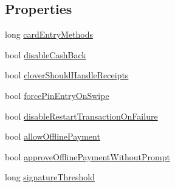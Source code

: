 \subsection*{Properties}
\begin{DoxyCompactItemize}
\item 
long \hyperlink{classcom_1_1clover_1_1sdk_1_1v3_1_1payments_1_1_transaction_settings_ad1e0b5409238f8adcd7cecd1c8d340bd}{card\+Entry\+Methods}
\item 
bool \hyperlink{classcom_1_1clover_1_1sdk_1_1v3_1_1payments_1_1_transaction_settings_a3509280eeb0afca8fe16f6912a5dcb61}{disable\+Cash\+Back}
\item 
bool \hyperlink{classcom_1_1clover_1_1sdk_1_1v3_1_1payments_1_1_transaction_settings_a0af7a01b27e4e6de4e963e40ef980126}{clover\+Should\+Handle\+Receipts}
\item 
bool \hyperlink{classcom_1_1clover_1_1sdk_1_1v3_1_1payments_1_1_transaction_settings_aa0d925d9075f5b2aa9e906138924d99f}{force\+Pin\+Entry\+On\+Swipe}
\item 
bool \hyperlink{classcom_1_1clover_1_1sdk_1_1v3_1_1payments_1_1_transaction_settings_ad50fd7dfe75f86df037472b2ca2ac4cc}{disable\+Restart\+Transaction\+On\+Failure}
\item 
bool \hyperlink{classcom_1_1clover_1_1sdk_1_1v3_1_1payments_1_1_transaction_settings_a37f32997a247da9381d1ad6efca9e359}{allow\+Offline\+Payment}
\item 
bool \hyperlink{classcom_1_1clover_1_1sdk_1_1v3_1_1payments_1_1_transaction_settings_aef67ff8f06211a29b4d69877f44f8d74}{approve\+Offline\+Payment\+Without\+Prompt}
\item 
long \hyperlink{classcom_1_1clover_1_1sdk_1_1v3_1_1payments_1_1_transaction_settings_a0313cf99617e7c91b986766c417b866c}{signature\+Threshold}
\item 

\end{DoxyCompactItemize}
